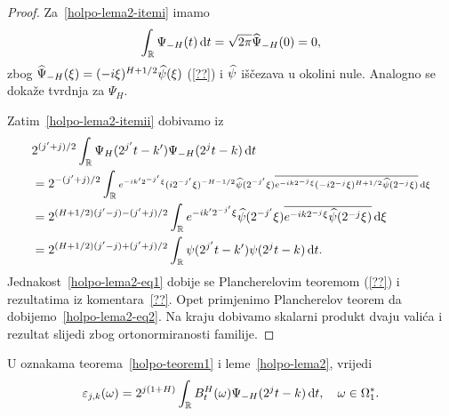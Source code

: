 \documentclass[main.tex]{subfiles}
\begin{document}
\begin{proof}
	Za~\ref{holpo-lema2-itemi} imamo
	\[
		\int_{\mathbb{R}} \Psi_{-H}(t) \,\mathrm d t = \sqrt{2\pi} \widehat{\Psi} _{-H} (0) = 0,
	\]
	zbog \( \widehat{\Psi}_{-H}(\xi) = (-i\xi)^{H+1/2}\widehat{\psi}(\xi) \) (\ref{??}) i \( \widehat{\psi} \)
	iščezava u okolini nule. Analogno se dokaže tvrdnja za \( \Psi_H \).

	Zatim~\ref{holpo-lema2-itemii} dobivamo iz
	\begin{align}\noindent
		 & 2^{( j'+j)/2} \int_\R \Psi_H(2^{j'}t-k')\Psi_{-H}(2^jt-k) \D t                                 \\
		 & = 2^{-(j'+j)/2}
		\int_\R  \scriptstyle{e^{-ik'2^{-j'}\xi}  (i2^{-j'}\xi)^{-H-1/2}\wh\psi(2^{-j'}\xi) \label{holpo-lema2-eq1}
		\ol{e^{-ik2^{-j}\xi}(-i2^{-j}\xi)^{H+1/2}\wh\psi(2^{-j}\xi)}\D \xi}                               \\
		 & = 2^{(H+1/2)(j'-j)-(j'+j)/2}\int_\R e^{-ik'2^{-j'}\xi}\wh\psi(2^{-j'}\xi)
		\ol{e^{-ik2^{-j}\xi}\wh\psi(2^{-j}\xi)} \D \xi                                                    \\
		 & = 2^{(H+1/2)(j'-j)+(j'+j)/2}\int_\R \psi(2^{j'}t-k')\psi(2^jt-k) \D t. \label{holpo-lema2-eq2}
	\end{align}
	Jednakost~\eqref{holpo-lema2-eq1} dobije se Plancherelovim teoremom (\ref{??})
	i rezultatima iz komentara~\ref{??}. Opet primjenimo Plancherelov teorem da dobijemo~\eqref{holpo-lema2-eq2}. Na kraju dobivamo skalarni produkt dvaju valića i rezultat slijedi
	zbog ortonormiranosti familije.
\end{proof}

\begin{propozicija}\label{holpo-prop2}
	U oznakama teorema~\ref{holpo-teorem1} i leme~\ref{holpo-lema2}, vrijedi
	\begin{equation}
		\varepsilon_{j,k}(\omega) = 2^{j(1+H)}\int_{\mathbb{R}} B^H_t(\omega)\Psi_{-H}(2^jt-k) \,\mathrm d t, \quad \omega \in \Omega_1^*.
	\end{equation}
\end{propozicija}
\end{document}
